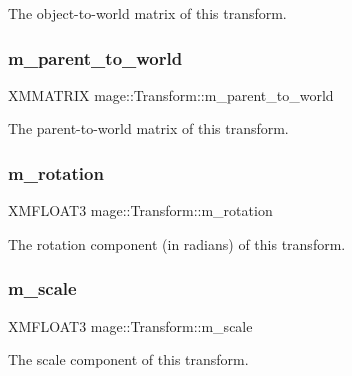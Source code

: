 The object-\/to-\/world matrix of this transform. \hypertarget{structmage_1_1_transform_af8b746deb2f7128d143063f3e11bc038}{}\label{structmage_1_1_transform_af8b746deb2f7128d143063f3e11bc038} 
\subsubsection{\texorpdfstring{m\+\_\+parent\+\_\+to\+\_\+world}{m\_parent\_to\_world}}
{\footnotesize\ttfamily X\+M\+M\+A\+T\+R\+IX mage\+::\+Transform\+::m\+\_\+parent\+\_\+to\+\_\+world\hspace{0.3cm}{\ttfamily [private]}}

The parent-\/to-\/world matrix of this transform. \hypertarget{structmage_1_1_transform_a037b4fb338bfe79aa2ab1a2e809c40df}{}\label{structmage_1_1_transform_a037b4fb338bfe79aa2ab1a2e809c40df} 
\subsubsection{\texorpdfstring{m\+\_\+rotation}{m\_rotation}}
{\footnotesize\ttfamily X\+M\+F\+L\+O\+A\+T3 mage\+::\+Transform\+::m\+\_\+rotation\hspace{0.3cm}{\ttfamily [private]}}

The rotation component (in radians) of this transform. \hypertarget{structmage_1_1_transform_a25d15c85b93037bab5b755c86bef0b54}{}\label{structmage_1_1_transform_a25d15c85b93037bab5b755c86bef0b54} 
\subsubsection{\texorpdfstring{m\+\_\+scale}{m\_scale}}
{\footnotesize\ttfamily X\+M\+F\+L\+O\+A\+T3 mage\+::\+Transform\+::m\+\_\+scale\hspace{0.3cm}{\ttfamily [private]}}

The scale component of this transform. \hypertarget{structmage_1_1_transform_a57e27b28e0cf85be034055a68513ad79}{}\label{structmage_1_1_transform_a57e27b28e0cf85be034055a68513ad79} 

